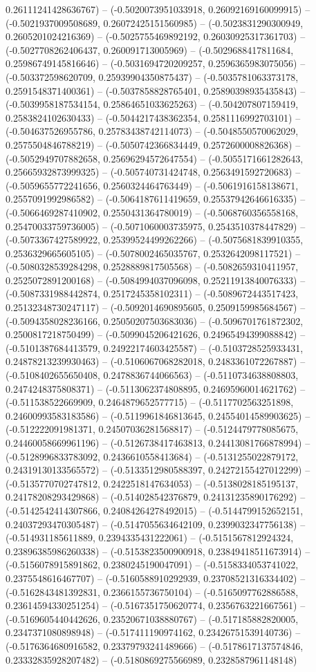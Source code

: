 0.26111241428636767) -- (-0.5020073951033918, 0.26092169160099915) -- (-0.5021937009508689, 0.26072425151560985) -- (-0.5023831290300949, 0.2605201024216369) -- (-0.5025755469892192, 0.26030925317361703) -- (-0.5027708262406437, 0.260091713005969) -- (-0.5029688417811684, 0.25986749145816646) -- (-0.5031694720209257, 0.2596365983075056) -- (-0.503372598620709, 0.25939904350875437) -- (-0.5035781063373178, 0.2591548371400361) -- (-0.5037858828765401, 0.25890398935435843) -- (-0.5039958187534154, 0.25864651033625263) -- (-0.504207807159419, 0.2583824102630433) -- (-0.5044217438362354, 0.2581116992703101) -- (-0.504637526955786, 0.25783438742114073) -- (-0.5048550570062029, 0.2575504846788219) -- (-0.5050742366834449, 0.2572600008826368) -- (-0.5052949707882658, 0.25696294572647554) -- (-0.5055171661282643, 0.25665932873999325) -- (-0.505740731424748, 0.2563491592720683) -- (-0.5059655772241656, 0.2560324464763449) -- (-0.5061916158138671, 0.2557091992986582) -- (-0.5064187611419659, 0.25537942646616335) -- (-0.5066469287410902, 0.2550431364780019) -- (-0.5068760356558168, 0.25470033759736005) -- (-0.5071060003735975, 0.2543510378447829) -- (-0.5073367427589922, 0.25399524499262266) -- (-0.5075681839910355, 0.2536329665605105) -- (-0.5078002465035767, 0.2532642098117521) -- (-0.5080328539284298, 0.2528889817505568) -- (-0.5082659310411957, 0.2525072891200168) -- (-0.5084994037096098, 0.25211913840076333) -- (-0.5087331988442874, 0.2517245358102311) -- (-0.5089672443517423, 0.25132348730247117) -- (-0.5092014690895605, 0.2509159985684567) -- (-0.5094358028236166, 0.25050207503683036) -- (-0.5096701761872302, 0.2500817218750499) -- (-0.5099045206421626, 0.24965494399088842) -- (-0.5101387684413579, 0.24922174603425587) -- (-0.5103728525933431, 0.24878213239930463) -- (-0.5106067068282018, 0.2483361072267887) -- (-0.5108402655650408, 0.2478836744066563) -- (-0.5110734638808803, 0.2474248375808371) -- (-0.5113062374808895, 0.24695960014621762) -- (-0.511538522669909, 0.2464879652577715) -- (-0.5117702563251898, 0.24600993583183586) -- (-0.5119961846813645, 0.24554014589903625) -- (-0.512222091981371, 0.24507036281568817) -- (-0.5124479778085675, 0.24460058669961196) -- (-0.5126738417463813, 0.24413081766878994) -- (-0.5128996833783092, 0.2436610558413684) -- (-0.5131255022879172, 0.24319130133565572) -- (-0.5133512980588397, 0.24272155427012299) -- (-0.5135770702747812, 0.2422518147634053) -- (-0.5138028185195137, 0.24178208293429868) -- (-0.514028542376879, 0.24131235890176292) -- (-0.5142542414307866, 0.24084264278492015) -- (-0.5144799152652151, 0.24037293470305487) -- (-0.5147055634642109, 0.2399032347756138) -- (-0.514931185611889, 0.2394335431222061) -- (-0.5151567812924324, 0.23896385986260338) -- (-0.5153823500900918, 0.23849418511673914) -- (-0.5156078915891862, 0.2380245190047091) -- (-0.5158334053741022, 0.2375548616467707) -- (-0.5160588910292939, 0.23708521316334402) -- (-0.5162843481392831, 0.2366155736750104) -- (-0.5165097762886588, 0.23614594330251254) -- (-0.5167351750620774, 0.2356763221667561) -- (-0.5169605440442626, 0.23520671038880767) -- (-0.517185882820005, 0.2347371080898948) -- (-0.517411190974162, 0.23426751539140736) -- (-0.5176364680916582, 0.23379793241489666) -- (-0.5178617137574846, 0.23332835928207482) -- (-0.5180869275566989, 0.2328587961148148) 
